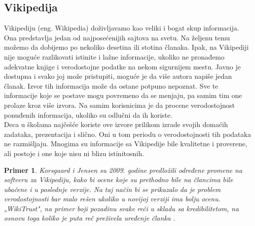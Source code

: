 \documentclass[a4paper]{article}
\newtheorem{primer}{Primer}[section]
\begin{document}
\subsection{Vikipedija}
\label{subsec:podnaslovIP1}

Vikipediju (eng. Wikipedia) doživljavamo kao veliki i bogat skup informacija. Ona predstavlja jedan od najposećenijih sajtova na svetu. Na željenu temu možemo da dobijemo po nekoliko desetina ili stotina članaka. Ipak, na Vikipediji nije moguće razlikovati istinite i lažne informacije, ukoliko ne pronađemo adekvatne knjige i verodostojne podatke na nekom sigurnijem mestu. Javno je dostupna i svako joj može pristupiti, moguće je da više autora napiše jedan članak. Izvor tih informacija može da ostane potpuno nepoznat. Sve te informacije koje se postave mogu povremeno da se menjaju, pa samim tim one prolaze kroz više izvora. Na samim korisnicima je da procene verodostojnost ponuđenih informacija, ukoliko su odlučni da ih koriste. \\Deca u školama najčešće koriste ove izvore prilikom izrade svojih domaćih zadataka, prezentacija i slično. Oni u tom periodu o verodostojnosti tih podataka ne razmišljaju. Mnogima su informacije sa Vikipedije bile kvalitetne i proverene, ali postoje i one koje nisu ni blizu istinitosnih.
\begin{primer}
Korsgaard i Jensen su 2009. godine predložili određene promene na softveru za Vikipediju, kako bi ocene koje su prethodno bile na člancima bile ubačene i u poslednje verzije. Na taj način bi se prikazalo da je problem verodostojnosti bar malo rešen ukoliko u novijoj verziji ima bolju ocenu. „WikiTrust", na primer boji pozadinu svake reči u skladu sa kredibilitetom, na osnovu toga koliko je puta reč preživela uređenje članka \cite{tInOnl}.
\end{primer}
\end{document}
